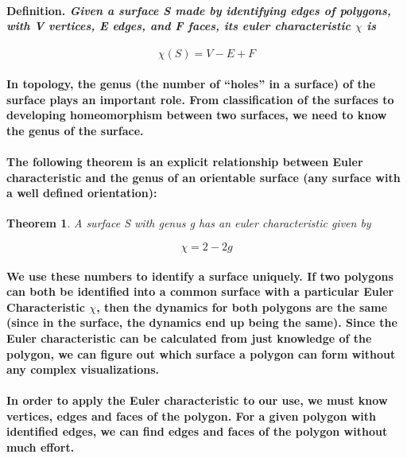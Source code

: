 \documentclass{report}
\newtheorem{theorem}{Theorem}[chapter]
\begin{document}
\paragraph{\textbf{Definition.} \textit{Given a surface \textit{S} made by identifying edges of polygons, with \textit{V} vertices, \textit{E} edges, and \textit{F} faces, its euler characteristic $\chi$ is}}

\begin{equation}
\mathit{\chi(S)=V-E+F}
\end{equation}

\paragraph{In topology, the genus (the number of “holes” in a surface) of the surface plays an important role. From classification of the surfaces to developing homeomorphism between two surfaces, we need to know the genus of the surface.}

\paragraph{The following theorem is an explicit relationship between Euler characteristic and the genus of an orientable surface (any surface with a well defined orientation):}

\begin{theorem}
A surface \textit{S} with genus \textit{g} has an euler characteristic given by
\end{theorem}

\begin{equation}
\chi=2-2g
\end{equation}

\paragraph{We use these numbers to identify a surface uniquely. If two polygons can both be identified into a common surface with a particular Euler Characteristic $\chi$, then the dynamics for both polygons are the same (since in the surface, the dynamics end up being the same). Since the Euler characteristic can be calculated from just knowledge of the polygon, we can figure out which surface a polygon can form without any complex visualizations.}

\paragraph{In order to apply the Euler characteristic to our use, we must know vertices, edges and faces of the polygon. For a given polygon with identified edges, we can find edges and faces of the polygon without much effort.}
\end{document}
